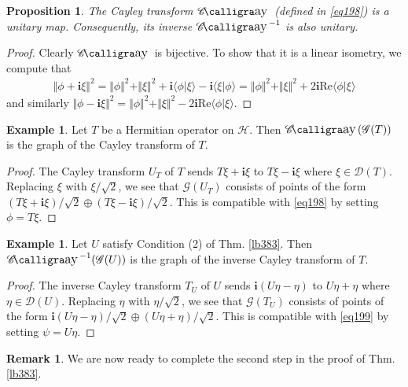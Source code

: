 \documentclass[12pt,b5paper,notitlepage]{article}
\theoremstyle{definition}
\newtheorem{eg}[df]{Example}
\newtheorem{rem}[df]{Remark}
\theoremstyle{plain}
\newtheorem{pp}[df]{Proposition}
\DeclareMathOperator{\Cay}{\mathscr{C}\text{\kern -3pt {\calligra\large ay}}\,}
\newcommand{\Dom}{\mathscr{D}}
\newcommand{\bk}[1]{\langle {#1}\rangle}
\newcommand{\im}{\mathbf{i}}
\newcommand{\Real}{\mathrm{Re}}
\newcommand{\MH}{\mathcal H}
\newcommand{\SG}{\mathscr G}
\numberwithin{equation}{section}
\begin{document}
\begin{pp}\label{lb391}
The Cayley transform $\Cay$ (defined in \eqref{eq198}) is a unitary map. Consequently, its inverse $\Cay^{-1}$ is also unitary.
\end{pp}


\begin{proof}
Clearly $\Cay$ is bijective. To show that it is a linear isometry, we compute that
\begin{align*}
\Vert\phi+\im\xi\Vert^2=\Vert\phi\Vert^2+\Vert\xi\Vert^2+\im\bk{\phi|\xi}-\im\bk{\xi|\phi}=\Vert\phi\Vert^2+\Vert\xi\Vert^2+2\im\Real\bk{\phi|\xi}
\end{align*}
and similarly $\Vert\phi-\im\xi\Vert^2=\Vert\phi\Vert^2+\Vert\xi\Vert^2-2\im\Real\bk{\phi|\xi}$.
\end{proof}



\begin{eg}\label{lb392}
Let $T$ be a Hermitian operator on $\MH$. Then $\Cay(\SG(T))$ is the graph of the Cayley transform of $T$.
\end{eg}

\begin{proof}
The Cayley transform $U_T$ of $T$ sends $T\xi+\im\xi$ to $T\xi-\im\xi$ where $\xi\in\Dom(T)$. Replacing $\xi$ with $\xi/\sqrt2$, we see that $\SG(U_T)$ consists of points of the form $(T\xi+\im\xi)/\sqrt2\oplus(T\xi-\im\xi)/\sqrt2$. This is compatible with \eqref{eq198} by setting $\phi=T\xi$.
\end{proof}


\begin{eg}\label{lb393}
Let $U$ satisfy Condition (2) of Thm. \ref{lb383}. Then $\Cay^{-1}(\SG(U))$ is the graph of the inverse Cayley transform of $T$.
\end{eg}

\begin{proof}
The inverse Cayley transform $T_U$ of $U$ sends $\im(U\eta-\eta)$ to $U\eta+\eta$ where $\eta\in\Dom(U)$. Replacing $\eta$ with $\eta/\sqrt2$, we see that $\SG(T_U)$ consists of points of the form $\im(U\eta-\eta)/\sqrt2\oplus(U\eta+\eta)/\sqrt2$. This is compatible with \eqref{eq199} by setting $\psi=U\eta$.
\end{proof}


\begin{rem}\label{lb394}
We are now ready to complete the second step in the proof of Thm. \ref{lb383}.
\end{rem}
\end{document}
